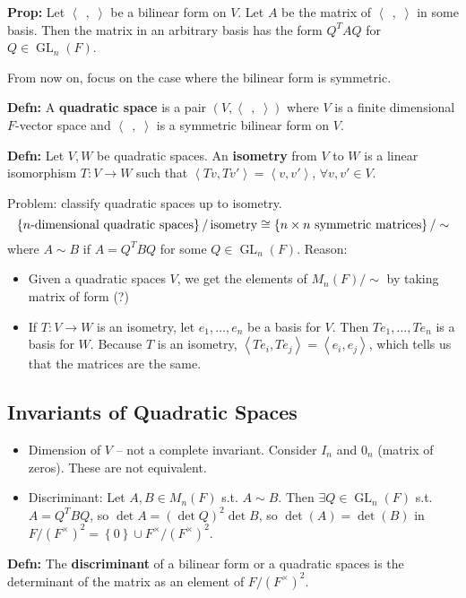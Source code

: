 \documentclass[10pt,letterpaper]{article}
\newcommand{\n}{\hfill\break}
\newcommand{\hangblock}[2]{\par\noindent\settowidth{\hangindent}{\textbf{#1: }}\textbf{#1: }\!\!\!#2}
\newcommand{\defn}[1]{\hangblock{Defn}{#1}}
\newcommand{\prop}[1]{\hangblock{Prop}{#1}}
\newcommand{\ptxt}[1]{\textrm{\textnormal{#1}}}
\newcommand{\set}[1]{\left\{#1\right\}}
\newcommand{\tpose}{^{T}\!}
\newcommand{\iprod}[1]{\left<#1\right>}
\newcommand{\giprod}{\iprod{\;\,,\;}}
\DeclareMathOperator{\GL}{GL}
\newcommand{\st}{s.t.}
\begin{document}
\prop{
	Let $\giprod$ be a bilinear form on $V$. Let $A$ be the matrix of $\giprod$ in some basis. Then the matrix in an arbitrary basis has the form $Q\tpose{}AQ$ for $Q\in\GL_{n}(F)$.\n
}

\par\noindent
From now on, focus on the case where the bilinear form is symmetric.\n

\defn{
	A \textbf{quadratic space} is a pair $(V,\giprod)$ where $V$ is a finite dimensional $F$-vector space and $\giprod$ is a symmetric bilinear form on $V$.\n
}

\defn{
	Let $V,W$ be quadratic spaces. An \textbf{isometry} from $V$ to $W$ is a linear isomorphism $T:V\to{}W$ such that $\iprod{Tv,Tv'}=\iprod{v,v'}$, $\forall{}v,v'\in{}V$.\n
}

\par\noindent
Problem: classify quadratic spaces up to isometry.
\[
	\set{\ptxt{$n$-dimensional quadratic spaces}}/\,\ptxt{isometry}\cong\set{\ptxt{$n\times{}n$ symmetric matrices}}/\sim
\]
where $A\sim{}B$ if $A=Q\tpose{}BQ$ for some $Q\in\GL_{n}(F)$. Reason:
\begin{itemize}[itemsep=0pt, topsep=0pt, label=-]
	\item Given a quadratic spaces $V$, we get the elements of $M_{n}(F)/\sim$ by taking matrix of form (?)
	\item If $T:V\to{}W$ is an isometry, let $e_{1},\ldots,e_{n}$ be a basis for $V$. Then $Te_{1},\ldots,Te_{n}$ is a basis for $W$. Because $T$ is an isometry, $\iprod{Te_{i},Te_{j}}=\iprod{e_{i},e_{j}}$, which tells us that the matrices are the same.
\end{itemize}

\subsection*{Invariants of Quadratic Spaces}

\begin{itemize}
	\item Dimension of $V$ -- not a complete invariant. Consider $I_{n}$ and $0_{n}$ (matrix of zeros). These are not equivalent.
	\item Discriminant: Let $A,B\in{}M_{n}(F)$ \st{} $A\sim{}B$. Then $\exists{}Q\in\GL_{n}(F)$ \st{} $A=Q\tpose{}BQ$, so $\det{}A=(\det{}Q)^{2}\det{}B$, so $\det(A)=\det(B)$ in $F/(F^{\times})^{2}=\set{0}\cup{}F^{\times}/(F^{\times})^{2}$.
\end{itemize}

\defn{
	The \textbf{discriminant} of a bilinear form or a quadratic spaces is the determinant of the matrix as an element of $F/(F^{\times})^{2}$.\n
}
\end{document}
